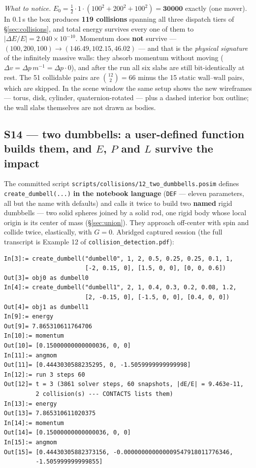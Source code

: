 \documentclass[11pt]{article}
\newcommand{\code}[1]{\texttt{#1}}
\begin{document}
\emph{What to notice.} $E_0 = \tfrac12\cdot 1\cdot(100^2 + 200^2 +
100^2) = \textbf{30000}$ exactly (one mover). In 0.1\,s the box
produces \textbf{119 collisions} spanning all three dispatch tiers of
\S\ref{sec:collisions}, and total energy survives every one of them to
$|\Delta E/E| = 2.040\times10^{-10}$. Momentum does \textbf{not}
survive --- $(100, 200, 100) \to (146.49, 102.15, 46.02)$ --- and that
is the \emph{physical signature} of the infinitely massive walls: they
absorb momentum without moving ($\Delta v = \Delta p\,m^{-1} =
\Delta p\cdot 0$), and after the run all six slabs are still
bit-identically at rest. The 51 collidable pairs are
$\binom{12}{2} = 66$ minus the 15 static wall--wall pairs, which are
skipped. In the scene window the same setup shows the new wireframes
--- torus, disk, cylinder, quaternion-rotated --- plus a dashed
interior box outline; the wall slabs themselves are not drawn as
bodies.

\subsection{S14 --- two dumbbells: a user-defined function builds them,
and $E$, $P$ and $L$ survive the impact}

The committed script \code{scripts/collisions/12\_two\_dumbbells.posim}
defines \code{create\_dumbell(...)} \textbf{in the notebook language}
(\code{DEF} --- eleven parameters, all but the name with defaults) and
calls it twice to build two \textbf{named} rigid dumbbells --- two solid
spheres joined by a solid rod, one rigid body whose local origin is its
center of mass (\S\ref{sec:union}). They approach off-center with spin
and collide twice, elastically, with $G = 0$. Abridged captured session
(the full transcript is Example 12 of \code{collision\_detection.pdf}):

\begin{lstlisting}
In[3]:= create_dumbell("dumbell0", 1, 2, 0.5, 0.25, 0.25, 0.1, 1,
                       [-2, 0.15, 0], [1.5, 0, 0], [0, 0, 0.6])
Out[3]= obj0 as dumbell0
In[4]:= create_dumbell("dumbell1", 2, 1, 0.4, 0.3, 0.2, 0.08, 1.2,
                       [2, -0.15, 0], [-1.5, 0, 0], [0.4, 0, 0])
Out[4]= obj1 as dumbell1
In[9]:= energy
Out[9]= 7.865310611764706
In[10]:= momentum
Out[10]= [0.15000000000000036, 0, 0]
In[11]:= angmom
Out[11]= [0.4443030588235295, 0, -1.5059999999999998]
In[12]:= run 3 steps 60
Out[12]= t = 3 (3861 solver steps, 60 snapshots, |dE/E| = 9.463e-11,
         2 collision(s) --- CONTACTS lists them)
In[13]:= energy
Out[13]= 7.865310611020375
In[14]:= momentum
Out[14]= [0.15000000000000036, 0, 0]
In[15]:= angmom
Out[15]= [0.44430305882373156, -0.000000000000009547918011776346,
         -1.505999999999855]
\end{lstlisting}
\end{document}

